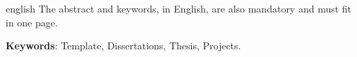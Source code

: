  \begin{otherlanguage*}{english}
The abstract and keywords, in English, are also mandatory and must fit in one page.
   \vspace{\onelineskip}
 
   \noindent 
   \textbf{Keywords}: Template, Dissertations, Thesis, Projects.
 \end{otherlanguage*}
